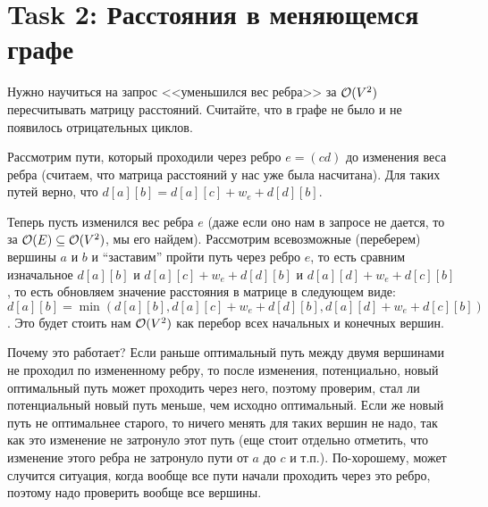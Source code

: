 \section{Task 2: Расстояния в меняющемся графе}
\begin{task}
	Нужно научиться на запрос <<уменьшился вес ребра>> за $\mathcal{O}(V^2)$ пересчитывать матрицу расстояний. 
	Считайте, что в графе не было и не появилось отрицательных циклов.
\end{task}

\begin{solution}
    Рассмотрим пути, который проходили через ребро $e = (cd)$ до изменения веса ребра (считаем, что матрица расстояний у нас уже была насчитана). Для таких путей верно, что $d[a][b] = d[a][c] + w_e + d[d][b]$.
    
    Теперь пусть изменился вес ребра $e$ (даже если оно нам в запросе не дается, то за $\mathcal{O}(E) \subseteq \mathcal{O}(V^2)$, мы его найдем). Рассмотрим всевозможные (переберем) вершины $a$ и $b$ и ``заставим'' пройти путь через ребро $e$, то есть сравним изначальное $d[a][b]$ и $d[a][c] + w_e + d[d][b]$ и $d[a][d] + w_e + d[c][b]$, то есть обновляем значение расстояния в матрице в следующем виде: $d[a][b] = \min(d[a][b], d[a][c] + w_e + d[d][b], d[a][d] + w_e + d[c][b])$. Это будет стоить нам $\mathcal{O}(V^2)$ как перебор всех начальных и конечных вершин.
    
    Почему это работает?
    Если раньше оптимальный путь между двумя вершинами не проходил по измененному ребру, то после изменения, потенциально, новый оптимальный путь может проходить через него, поэтому проверим, стал ли потенциальный новый путь меньше, чем исходно оптимальный. Если же новый путь не оптимальнее старого, то ничего менять для таких вершин не надо, так как это изменение не затронуло этот путь (еще стоит отдельно отметить, что изменение этого ребра не затронуло пути от $a$ до $c$ и т.п.). По-хорошему, может случится ситуация, когда вообще все пути начали проходить через это ребро, поэтому надо проверить вообще все вершины.

\end{solution}